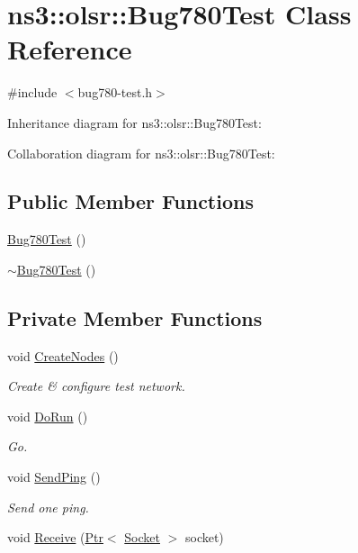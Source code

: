 \hypertarget{classns3_1_1olsr_1_1Bug780Test}{}\section{ns3\+:\+:olsr\+:\+:Bug780\+Test Class Reference}
\label{classns3_1_1olsr_1_1Bug780Test}


{\ttfamily \#include $<$bug780-\/test.\+h$>$}



Inheritance diagram for ns3\+:\+:olsr\+:\+:Bug780\+Test\+:


Collaboration diagram for ns3\+:\+:olsr\+:\+:Bug780\+Test\+:
\subsection*{Public Member Functions}
\begin{DoxyCompactItemize}
\item 
\hyperlink{classns3_1_1olsr_1_1Bug780Test_a52a98d8f90c20316be3b20c77c7e1722}{Bug780\+Test} ()
\item 
\hyperlink{classns3_1_1olsr_1_1Bug780Test_ab08c3080647eae744e50e11d15ea6241}{$\sim$\+Bug780\+Test} ()
\end{DoxyCompactItemize}
\subsection*{Private Member Functions}
\begin{DoxyCompactItemize}
\item 
void \hyperlink{classns3_1_1olsr_1_1Bug780Test_a87a836a5491da4a21a0b51d2a647b422}{Create\+Nodes} ()
\begin{DoxyCompactList}\small\item\em Create \& configure test network. \end{DoxyCompactList}\item 
void \hyperlink{classns3_1_1olsr_1_1Bug780Test_aea2f01c8e6af5f1363b67a23ccaaf030}{Do\+Run} ()
\begin{DoxyCompactList}\small\item\em Go. \end{DoxyCompactList}\item 
void \hyperlink{classns3_1_1olsr_1_1Bug780Test_acdcf92bc12c53b5df1da229300d2f280}{Send\+Ping} ()
\begin{DoxyCompactList}\small\item\em Send one ping. \end{DoxyCompactList}\item 
void \hyperlink{classns3_1_1olsr_1_1Bug780Test_a60afdb8b514c6b9528e65305d43126dd}{Receive} (\hyperlink{classns3_1_1Ptr}{Ptr}$<$ \hyperlink{classns3_1_1Socket}{Socket} $>$ socket)
\end{DoxyCompactItemize}
